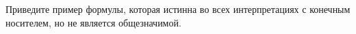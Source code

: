 Приведите пример формулы, которая истинна во всех интерпретациях с конечным носителем, но не является общезначимой.